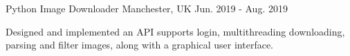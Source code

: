 \begin{cventries}
  \cventry
    {Python} %
    {Image Downloader} %
    {Manchester, UK} %
    {Jun. 2019 - Aug. 2019} %
    {
      \begin{cvitems} %
        \item {Designed and implemented an API supports login, multithreading downloading, parsing and filter images, along with a graphical user interface.}
      \end{cvitems}
    }
  
    


    





\end{cventries}
